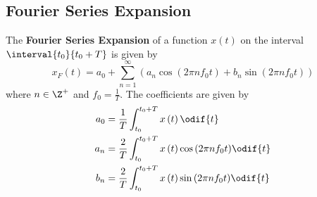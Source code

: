 \documentclass{article}
\begin{document}
\subsection{Fourier Series Expansion}
The \textbf{Fourier Series Expansion} of a function \(x\left( t
\right)\) on the interval \(\interval{t_0}{t_0 + T}\) is given by
\begin{equation*}
    x_F\left( t \right) = a_0 + \sum_{n = 1}^\infty \left( a_n \cos{\left( 2\pi n f_0 t \right)} + b_n \sin{\left( 2\pi n f_0 t \right)} \right)
\end{equation*}
where \(n \in \Z^{+}\) and \(f_0 = \frac{1}{T}\). The coefficients are given by
\begin{align*}
    a_0 & = \frac{1}{T} \int_{t_0}^{t_0 + T} x\left( t \right) \odif{t}                                   \\
    a_n & = \frac{2}{T} \int_{t_0}^{t_0 + T} x\left( t \right) \cos{\left( 2\pi n f_0 t \right)} \odif{t} \\
    b_n & = \frac{2}{T} \int_{t_0}^{t_0 + T} x\left( t \right) \sin{\left( 2\pi n f_0 t \right)} \odif{t}
\end{align*}
\end{document}
